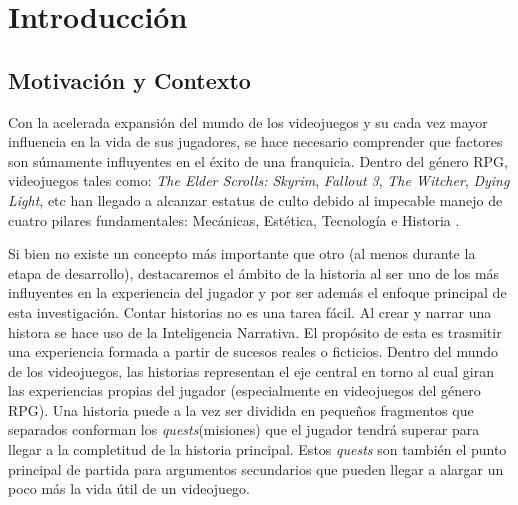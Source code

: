 \chapter{Introducción}



\section{Motivación y Contexto}


Con la acelerada expansión del mundo de los videojuegos y su cada vez mayor influencia en la vida de sus jugadores, se hace necesario comprender que factores son súmamente influyentes en el éxito de una franquicia. Dentro del género \ac{RPG}, videojuegos tales como: \textit{The Elder Scrolls: Skyrim}, \textit{Fallout 3}, \textit{The Witcher}, \textit{Dying Light}, etc han llegado a alcanzar estatus de culto debido al impecable manejo de cuatro pilares fundamentales: Mecánicas, Estética, Tecnología e Historia \cite{schell2019art}. 

Si bien no existe un concepto más importante que otro (al menos durante la etapa de desarrollo), destacaremos el ámbito de la historia al ser uno de los más influyentes en la experiencia del jugador y por ser además el enfoque principal de esta investigación. Contar historias no es una tarea fácil. Al crear y narrar una histora se hace uso de la Inteligencia Narrativa. El propósito de esta es trasmitir una experiencia formada a partir de sucesos reales o ficticios. Dentro del mundo de los videojuegos, las historias representan el eje central en torno al cual giran las experiencias propias del jugador (especialmente en videojuegos del género \ac{RPG}). Una historia puede a la vez ser dividida en pequeños fragmentos que separados conforman los \textit{quests}(misiones) \cite{doran2010towards} que el jugador tendrá superar para llegar a la completitud de la historia principal. Estos \textit{quests} son también el punto principal de partida para argumentos secundarios que pueden llegar a alargar un poco más la vida útil de un videojuego. 

